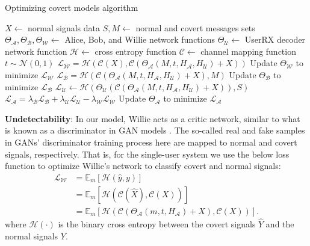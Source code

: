 \begin{algorithm}[tp!]
	\caption{Optimizing covert models algorithm}\label{alg:cap}
	\small
	\begin{algorithmic}
		\State $X \gets$ normal signals data
		\State $S, M \gets$ normal and covert messages sets
		\State $\Theta_{\mathcal{A}}, \Theta_{\mathcal{B}}, \Theta_{\mathcal{W}} \gets$ Alice, Bob, and Willie network functions
		\State $\Theta_{\mathcal{U}} \gets$ UserRX decoder network function
		\State $\mathcal{H} \gets$ cross entropy function
		\State $\mathcal{C} \gets$ channel mapping function
		\State $t \sim \mathcal{N}(0, 1)$
		\State $\mathcal{L}_{\mathcal{W}} = \mathcal{H}(\mathcal{C}(X), \mathcal{C}(\Theta_{\mathcal{A}}(M, t, H_{\mathcal{A}}, H_{\mathcal{U}}) + X))$
		\State Update $\Theta_{\mathcal{W}}$ to minimize $\mathcal{L}_{\mathcal{W}}$
		\State $\mathcal{L}_{\mathcal{B}} = \mathcal{H}(\mathcal{C}(\Theta_{\mathcal{A}}(M, t, H_{\mathcal{A}}, H_{\mathcal{U}}) + X), M)$
		\State Update $\Theta_{\mathcal{B}}$ to minimize $\mathcal{L}_{\mathcal{B}}$
		\State $\mathcal{L}_{\mathcal{U}} \gets \mathcal{H}(\Theta_{\mathcal{U}}(\mathcal{C}(\Theta_{\mathcal{A}}(M, t, H_{\mathcal{A}}, H_{\mathcal{U}}) + X)), S)$
		\State
		$\mathcal{L}_{\mathcal{A}} = \lambda_{\mathcal{B}} \mathcal{L}_{\mathcal{B}} + \lambda_{\mathcal{U}} \mathcal{L}_{\mathcal{U}} - \lambda_{\mathcal{W}} \mathcal{L}_{\mathcal{W}}$
		\State Update $\Theta_{\mathcal{A}}$ to minimize $\mathcal{L}_{\mathcal{A}}$
		\EndFor
	\end{algorithmic}
\end{algorithm}

\textbf{Undetectability}: In our model, Willie acts as a critic network, similar to what is known as a discriminator in GAN models \cite{goodfellow2014generative}. The so-called real and fake samples in GANs' discriminator training process here are mapped to normal and covert signals, respectively. That is, for the single-user system we use the below loss function to optimize Willie's network to classify covert and normal signals:
\begin{equation}
	\begin{aligned} \label{willie_loss}
	\mathcal{L}_{\mathcal{W}} & = \mathbb{E}_{m}[\mathcal{H}(\hat{y}, y)] \\
	& = \mathbb{E}_{m}[\mathcal{H}(\mathcal{C}(\hat{X}), \mathcal{C}(X))] \\
	& = \mathbb{E}_{m}[\mathcal{H}(\mathcal{C}(\Theta_{\mathcal{A}}(m, t, H_{\mathcal{A}}) + X), \mathcal{C}(X))].
	\end{aligned}
\end{equation}
where \(\mathcal{H}(\cdot)\) is the binary cross entropy between the covert signals \(\hat{Y}\) and the normal signals \(Y\). 

